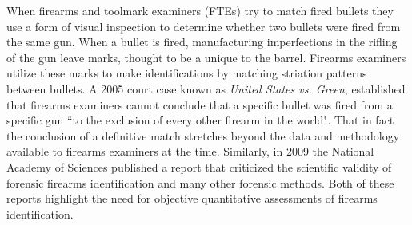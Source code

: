 \documentclass[12pt]{article}\usepackage[]{graphicx}\usepackage[]{color}
\theoremstyle{nonumberplain}
\begin{document}
When firearms and toolmark examiners (FTEs) try to match fired bullets they use a form of visual inspection to determine whether two bullets were fired from the same gun. When a bullet is  fired, manufacturing imperfections in the rifling of the gun  leave marks, thought to be a unique to the barrel. Firearms examiners utilize these marks to make identifications by matching striation patterns between bullets. A 2005 court case known as \textit{United States vs. Green}, established that firearms examiners cannot conclude that a specific bullet was fired from a specific gun ``to the exclusion of every other firearm in the world". That in fact the conclusion of a definitive match stretches beyond the data and methodology available to firearms examiners at the time.  Similarly, in 2009 the National Academy of Sciences published a report that criticized the scientific validity of forensic firearms identification and many other forensic methods. Both of these reports highlight the need for objective quantitative assessments of firearms identification. 
\end{document}
